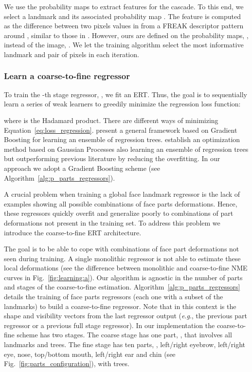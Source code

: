 \documentclass[11pt,twocolumn]{article}
\newcommand{\eg}{\textit{e}.\textit{g}., }
\begin{document}
We use the probability maps  to extract features for the cascade. To this end, we select a landmark  and its associated probability map . The feature is computed as the difference between two pixels values in  from a FREAK descriptor pattern~\citep{Alahi12} around , similar to those in \cite{Lee15b}. However, ours are defined on the probability maps, , instead of the image, . We let the training algorithm select the most informative landmark and pair of pixels in each iteration.

\subsubsection{Learn a coarse-to-fine regressor} 
To train the -th stage regressor, , we fit an ERT. Thus, the goal is to sequentially learn a series of weak learners to greedily minimize the regression loss function:

where  is the Hadamard product. There are different ways of minimizing Equation~\ref{eq:loss_regression}. \cite{Kazemi14} present a general framework based on Gradient Boosting for learning an ensemble of regression trees. \cite{Lee15b} establish an optimization method based on Gaussian Processes also learning an ensemble of regression trees but outperforming previous literature by reducing the overfitting.  In our approach we adopt a Gradient Boosting scheme (see Algorithm~\ref{alg:p_parts_regressors}).

A crucial problem when training a global face landmark regressor is the lack of examples showing all possible combinations of face parts deformations. Hence, these regressors quickly overfit and generalize poorly to combinations of part deformations not present in the training set.
To address this problem we introduce the coarse-to-fine ERT architecture.

The goal is to be able to cope with combinations of face part deformations not seen during training. A single monolithic regressor is not able to estimate these local deformations (see the difference between monolithic and coarse-to-fine NME curves in Fig.~\ref{fig:learning:a}). Our algorithm is agnostic in the number of parts and stages of the coarse-to-fine estimation. Algorithm~\ref{alg:p_parts_regressors} details the training of  face parts regressors (each one with a subset of the landmarks) to build a coarse-to-fine regressor. Note that  in this context is the shape and visibility vectors from the last regressor output (\eg the previous part regressor or a previous full stage regressor). In our implementation the coarse-to-fine scheme has two stages. The coarse stage has one part, , that involves all landmarks and  trees. The fine stage has ten parts, , left/right eyebrow, left/right eye, nose, top/bottom mouth, left/right ear and chin (see Fig.~\ref{fig:parts_configuration}), with  trees.
\end{document}
